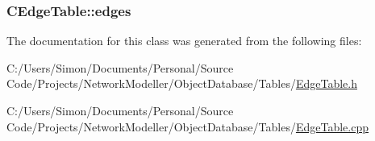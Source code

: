 \subsubsection[{edges}]{ C\+Edge\+Table\+::edges}\label{class_c_edge_table_a77fb8579345ec3d392a72797366d66b9}


The documentation for this class was generated from the following files\+:\begin{DoxyCompactItemize}
\item 
C\+:/\+Users/\+Simon/\+Documents/\+Personal/\+Source Code/\+Projects/\+Network\+Modeller/\+Object\+Database/\+Tables/\hyperlink{_edge_table_8h}{Edge\+Table.\+h}\item 
C\+:/\+Users/\+Simon/\+Documents/\+Personal/\+Source Code/\+Projects/\+Network\+Modeller/\+Object\+Database/\+Tables/\hyperlink{_edge_table_8cpp}{Edge\+Table.\+cpp}\end{DoxyCompactItemize}
